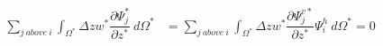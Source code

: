 \begin{equation}
\begin{array}{ll}
\displaystyle{\sum_{j~above~i}}\displaystyle{\int_{\Omega^{\ast}}}\Delta zw^{\ast}
\dfrac{\partial\Psi_{j}^{\ast}}{\partial z^{\ast}}~d\Omega^{\ast} & =
\displaystyle{\sum_{j~above~i}}\displaystyle{\int_{\Omega^{\ast}}}\Delta zw^{\ast}
\dfrac{\partial\Psi_{j}^{v\ast}}{\partial z^{\ast}}\Psi_{i}^{h}~d\Omega^{\ast}%
= 0
\end{array}
\end{equation}
